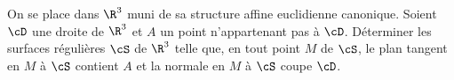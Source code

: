 \begin{enonce}
\begin{exercise}[ID={RMS122-2 E113 X MP},subtitle={},tags={}]
On se place dans $\R^3$ muni de sa structure affine euclidienne canonique.
Soient $\cD$ une droite de $\R^3$ et $A$ un point n'appartenant pas à $\cD$.
Déterminer les surfaces régulières $\cS$ de $\R^3$ telle que, en tout point $M$ de $\cS$, le plan tangent en $M$ à $\cS$ contient $A$ et la normale en $M$ à $\cS$ coupe $\cD$.
\end{exercise}
\begin{solution}
\end{solution}
\end{enonce}
